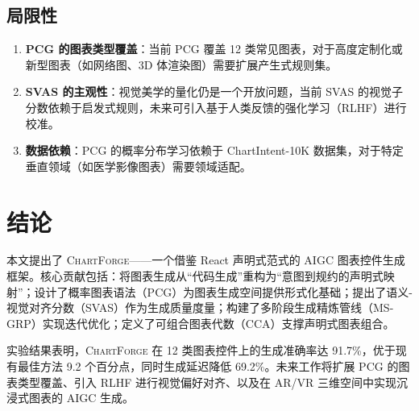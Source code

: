 \documentclass[12pt,a4paper]{ctexart}
\theoremstyle{remark}
\newcommand{\ChartForge}{\textsc{ChartForge}}
\begin{document}
\subsection{局限性}

\begin{enumerate}[leftmargin=*]
    \item \textbf{PCG 的图表类型覆盖}：当前 PCG 覆盖 12 类常见图表，对于高度定制化或新型图表（如网络图、3D 体渲染图）需要扩展产生式规则集。
    \item \textbf{SVAS 的主观性}：视觉美学的量化仍是一个开放问题，当前 SVAS 的视觉子分数依赖于启发式规则，未来可引入基于人类反馈的强化学习（RLHF）进行校准。
    \item \textbf{数据依赖}：PCG 的概率分布学习依赖于 ChartIntent-10K 数据集，对于特定垂直领域（如医学影像图表）需要领域适配。
\end{enumerate}

\section{结论}

本文提出了 \ChartForge{}——一个借鉴 React 声明式范式的 AIGC 图表控件生成框架。核心贡献包括：将图表生成从“代码生成”重构为“意图到规约的声明式映射”；设计了概率图表语法（PCG）为图表生成空间提供形式化基础；提出了语义-视觉对齐分数（SVAS）作为生成质量度量；构建了多阶段生成精炼管线（MS-GRP）实现迭代优化；定义了可组合图表代数（CCA）支撑声明式图表组合。

实验结果表明，\ChartForge{} 在 12 类图表控件上的生成准确率达 91.7\%，优于现有最佳方法 9.2 个百分点，同时生成延迟降低 69.2\%。未来工作将扩展 PCG 的图表类型覆盖、引入 RLHF 进行视觉偏好对齐、以及在 AR/VR 三维空间中实现沉浸式图表的 AIGC 生成。

\end{document}
